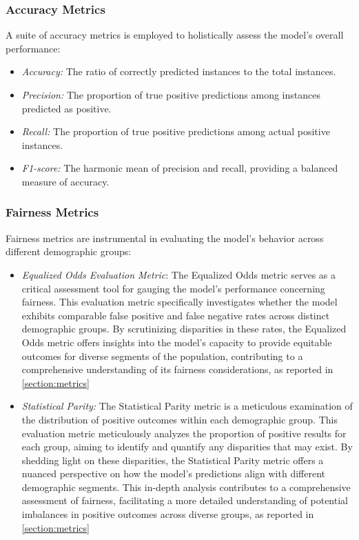 \documentclass[12pt,a4paper,openright,twoside]{book}
\begin{document}
\subsubsection{Accuracy Metrics}

A suite of accuracy metrics is employed to holistically assess the model's overall performance:

\begin{itemize}
    \item \emph{Accuracy:} The ratio of correctly predicted instances to the total instances.
    
    \item \emph{Precision:} The proportion of true positive predictions among instances predicted as positive.
    
    \item \emph{Recall:} The proportion of true positive predictions among actual positive instances.
    
    \item \emph{F1-score:} The harmonic mean of precision and recall, providing a balanced measure of accuracy.
\end{itemize}

\subsubsection{Fairness Metrics}

Fairness metrics are instrumental in evaluating the model's behavior across different demographic groups:

\begin{itemize}
    
    \item \emph{Equalized Odds Evaluation Metric}: The Equalized Odds metric serves as a critical assessment tool for gauging the model's performance concerning fairness. This evaluation metric specifically investigates whether the model exhibits comparable false positive and false negative rates across distinct demographic groups. By scrutinizing disparities in these rates, the Equalized Odds metric offers insights into the model's capacity to provide equitable outcomes for diverse segments of the population, contributing to a comprehensive understanding of its fairness considerations, as reported in \cref{section:metrics}
    
    \item \emph{Statistical Parity:} The Statistical Parity metric is a meticulous examination of the distribution of positive outcomes within each demographic group. This evaluation metric meticulously analyzes the proportion of positive results for each group, aiming to identify and quantify any disparities that may exist. By shedding light on these disparities, the Statistical Parity metric offers a nuanced perspective on how the model's predictions align with different demographic segments. This in-depth analysis contributes to a comprehensive assessment of fairness, facilitating a more detailed understanding of potential imbalances in positive outcomes across diverse groups, as reported in \cref{section:metrics}

\end{itemize}
\end{document}
